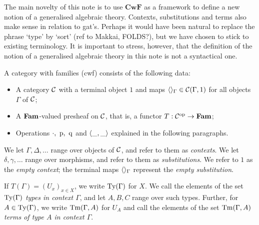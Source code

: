 \documentclass{lmcs}
\def\Cwf{\mathbf{CwF}}
\begin{document}
The main novelty of this note is to use $\Cwf$ as a framework
to define a new notion of a generalised algebraic theory. 
Contexts, substitutions and terms also make
sense in relation to gat's. Perhaps it would have been natural
to replace the phrase `type' by `sort' (ref to Makkai, FOLDS?),
but we have chosen to stick to existing terminology.
It is important to stress, however, that the definition
of the notion of a generalised algebraic theory in this note
is not a syntactical one. 


\begin{definition}\label{def:cwf} 
A category with families (cwf) consists of the following data:
\begin{itemize} 

\item A category ${\mathcal C}$ with a terminal object $1$ and maps
$\langle  \rangle_\Gamma \in {\mathcal C}(\Gamma, 1)$ for all objects $\Gamma$ of ${\mathcal C}$;

\item A $\textbf{Fam}$-valued presheaf on ${\mathcal C}$, that is, a functor
$T : {\mathcal C}^{\text{op}} \to \textbf{Fam}$;

\item Operations ${\cdot},~\mathrm{p},~\mathrm{q}$ and $\langle \_,\_ \rangle$ 
explained in the following paragraphs.
\end{itemize}

We let $\Gamma, \Delta,\ldots$ range over objects of ${\mathcal C}$, 
and refer to them as \emph{contexts}. 
We let $\delta, \gamma,\ldots$ range over morphisms, 
and refer to them as \emph{substitutions}. 
We refer to $1$ as the \emph{empty context}; the terminal maps
$\langle  \rangle_\Gamma$ represent the \emph{empty substitution}.

If $T(\Gamma) = (U_x)_{x\in X}$, we write $\mathrm{Ty}(\Gamma)$ for $X$.
We call the elements of the set $\mathrm{Ty}(\Gamma)$
\emph{types in context $\Gamma$}, and let $A, B, C$ range over such types. 
Further, for $A \in \mathrm{Ty}(\Gamma)$, we write $\mathrm{Tm}(\Gamma, A)$ for $U_A$
and call the elements of the set $\mathrm{Tm}(\Gamma, A)$
\emph{terms of type $A$ in context $\Gamma$}. 


\end{definition}
\end{document}
